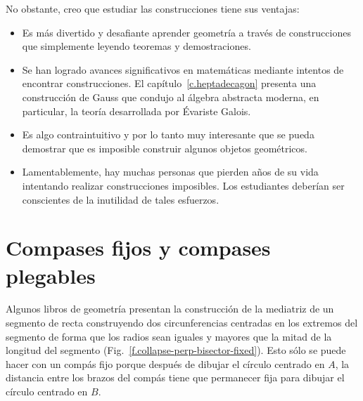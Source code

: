No obstante, creo que estudiar las construcciones tiene sus ventajas:
\begin{itemize}
\item Es más divertido y desafiante aprender geometría a través de construcciones que simplemente leyendo teoremas y demostraciones.
\item Se han logrado avances significativos en matemáticas mediante intentos de encontrar construcciones. El capítulo~\ref{c.heptadecagon} presenta una construcción de Gauss que condujo al álgebra abstracta moderna, en particular, la teoría desarrollada por \'{E}variste Galois.
\item Es algo contraintuitivo y por lo tanto muy interesante que se pueda demostrar que es imposible construir algunos objetos geométricos.
\item Lamentablemente, hay muchas personas que pierden años de su vida intentando realizar construcciones imposibles. Los estudiantes deberían ser conscientes de la inutilidad de tales esfuerzos.
\end{itemize}

\section{Compases fijos y compases plegables}\label{s.collapse}

Algunos libros de geometría presentan la construcción de la mediatriz de un segmento de recta construyendo dos circunferencias centradas en los extremos del segmento de forma que los radios sean iguales y mayores que la mitad de la longitud del segmento (Fig.~\ref{f.collapse-perp-bisector-fixed}). Esto sólo se puede hacer con un compás fijo porque después de dibujar el círculo centrado en $A$, la distancia entre los brazos del compás tiene que permanecer fija para dibujar el círculo centrado en $B$.

